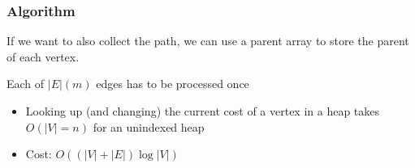\documentclass[letterpaper,12pt]{article}
\begin{document}
\subsubsection{Algorithm}
\begin{algorithmic}
            \EndIf
        \EndFor
    \EndWhile
\end{algorithmic}
If we want to also collect the path, we can use a parent array to store the parent of each vertex.

Each of $|E|(m)$ edges has to be processed once \begin{itemize}
    \item Looking up (and changing) the current cost of a vertex in a heap takes $O(|V| = n)$ for an unindexed heap
    \item Cost: $O((|V|+|E|)\log |V|)$
\end{itemize}
\end{document}
